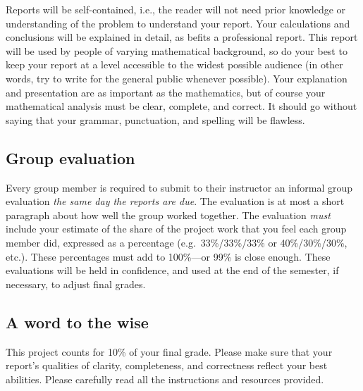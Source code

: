 \documentclass{article}
\begin{document}
Reports will be self-contained, i.e., the reader will not need prior knowledge
or understanding of the problem to understand your report. Your calculations
and conclusions will be explained in detail, as befits a professional report.
This report will be used by people of varying mathematical background, so do
your best to keep your report at a level accessible to the widest possible
audience (in other words, try to write for the general public whenever
possible). Your explanation and presentation are as important as the
mathematics, but of course your mathematical analysis must be clear, complete,
and correct. It should go without saying that your grammar, punctuation, and
spelling will be flawless.

\subsection*{Group evaluation}
\vspace{-2.8ex}

Every group member is required to submit to their instructor an informal group
evaluation \emph{the same day the reports are due}. The evaluation is at most
a short paragraph about how well the group worked together. The evaluation
\emph{must} include your estimate of the share of the project work that you
feel each group member did, expressed as a percentage (e.g.~33\%/33\%/33\% or
40\%/30\%/30\%, etc.). These percentages must add to 100\%---or 99\% is close
enough. These evaluations will be held in confidence, and used at the end of
the semester, if necessary, to adjust final grades.

\subsection*{A word to the wise}
\vspace{-2.8ex}

This project counts for 10\% of your final grade. Please make sure that
your report's qualities of clarity, completeness, and correctness
reflect your best abilities. Please carefully read all the instructions
and resources provided.
\end{document}
